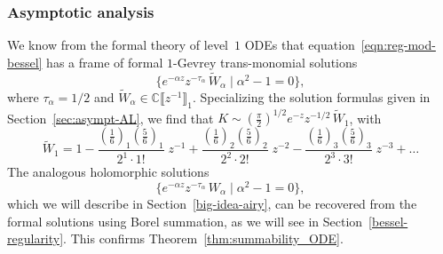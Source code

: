\documentclass{article}
\newcommand{\C}{\mathbb{C}}
\newcommand{\series}[1]{\tilde{#1}}
\theoremstyle{definition}
\theoremstyle{plain}
\newenvironment{revised}{\color{DarkBlue}}{\color{black}}
\begin{document}
\subsubsection{Asymptotic analysis}%
\begin{revised}
%
We know from the formal theory of level~$1$ ODEs that equation~\eqref{eqn:reg-mod-bessel} has a frame of formal $1$-Gevrey trans-monomial solutions
\[ \{ e^{-\alpha z} z^{-\tau_\alpha}\,\series{W}_\alpha \mid \alpha^2 - 1 = 0 \}, \]
where $\tau_\alpha = 1/2$ and $\series{W}_\alpha\in\C\llbracket z^{-1} \rrbracket_1$. Specializing the solution formulas given in Section~\ref{sec:asympt-AL}, we find that $K \sim \left(\tfrac{\pi}{2}\right)^{1/2} e^{-z} z^{-1/2}\,\series{W}_1$, with
\begin{equation}\label{bessel-asymp}
\series{W}_1 = 1 - \frac{(\tfrac{1}{6})_1 (\tfrac{5}{6})_1}{2^1 \cdot 1!}\;z^{-1} + \frac{(\tfrac{1}{6})_2 (\tfrac{5}{6})_2}{2^2 \cdot 2!}\;z^{-2} - \frac{(\tfrac{1}{6})_3 (\tfrac{5}{6})_3}{2^3 \cdot 3!}\;z^{-3} + \ldots
\end{equation}
%
The analogous holomorphic solutions
\[ \{ e^{-\alpha z} z^{-\tau_\alpha}\,W_\alpha \mid \alpha^2 - 1 = 0 \}, \]
which we will describe in Section~\ref{big-idea-airy}, can be recovered from the formal solutions using Borel summation, as we will see in Section~\ref{bessel-regularity}. This confirms Theorem~\ref{thm:summability_ODE}.
%

\end{revised}
\end{document}
